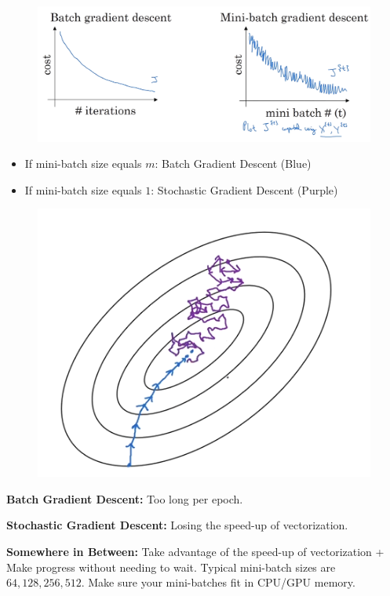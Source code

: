 \begin{figure}[H]
    \includegraphics[scale=0.35]{images/minibatch.png}
    \centering
\end{figure}

\begin{itemize}
    \item If mini-batch size equals $m$: Batch Gradient Descent (Blue)
    \item If mini-batch size equals $1$: Stochastic Gradient Descent (Purple)
\end{itemize}

\begin{figure}[H]
    \includegraphics[scale=0.35]{images/stochastic.png}
    \centering
\end{figure}

\textbf{Batch Gradient Descent:} Too long per epoch.

\textbf{Stochastic Gradient Descent:} Losing the speed-up of vectorization. 

\textbf{Somewhere in Between:} Take advantage of the speed-up of vectorization + Make progress without needing to wait. Typical mini-batch sizes are $64, 128, 256, 512$. Make sure your mini-batches fit in CPU/GPU memory. 

